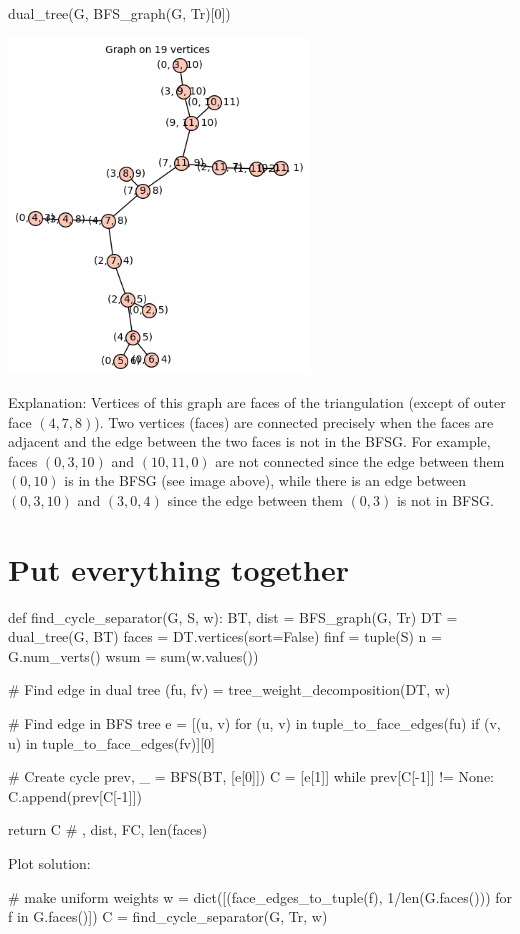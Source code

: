 \begin{sageCell}
    dual_tree(G, BFS_graph(G, Tr)[0])
\end{sageCell}
\begin{outImage}
    \includegraphics[width=0.6\textwidth]{Images/BalancedSeparators/dual_tree.png}
\end{outImage}
Explanation: Vertices of this graph are faces of the triangulation (except of outer face $(4, 7, 8)$). Two vertices (faces) are connected precisely when the faces are adjacent and the edge between the two faces is not in the BFSG.
For example, faces $(0, 3, 10)$ and $(10, 11, 0)$ are not connected since the edge between them $(0, 10)$ is in the BFSG (see image above), while there is an edge between $(0, 3, 10)$ and $(3, 0, 4)$ since the edge between them $(0, 3)$ is not in BFSG.

\section*{Put everything together}

\begin{sageCell}
def find_cycle_separator(G, S, w):
    BT, dist = BFS_graph(G, Tr)
    DT = dual_tree(G, BT)
    faces = DT.vertices(sort=False)
    finf = tuple(S)
    n = G.num_verts()
    wsum = sum(w.values())

    # Find edge in dual tree
    (fu, fv) = tree_weight_decomposition(DT, w)

    # Find edge in BFS tree
    e = [(u, v) for (u, v) in tuple_to_face_edges(fu) if (v, u) in tuple_to_face_edges(fv)][0]

    # Create cycle
    prev, _ = BFS(BT, [e[0]])
    C = [e[1]]
    while prev[C[-1]] != None:
        C.append(prev[C[-1]])

    return C # , dist, FC, len(faces)
\end{sageCell}
Plot solution:
\begin{sageCell}
    # make uniform weights
    w = dict([(face_edges_to_tuple(f), 1/len(G.faces())) for f in G.faces()])
    C = find_cycle_separator(G, Tr, w)
\end{sageCell}


